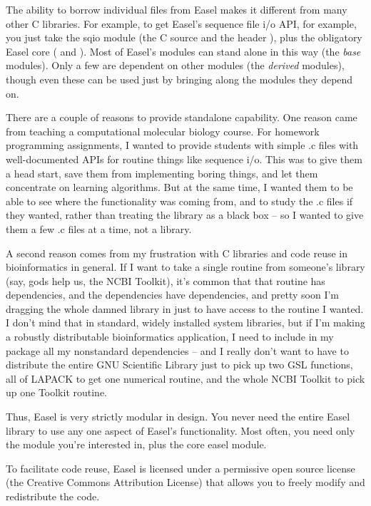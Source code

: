 The ability to borrow individual files from Easel makes it different
from many other C libraries. For example, to get Easel's sequence file
i/o API, for example, you just take the sqio module (the C source
 and the header ), plus the
obligatory Easel core ( and ). Most of
Easel's modules can stand alone in this way (the \emph{base}
modules). Only a few are dependent on other modules (the
\emph{derived} modules), though even these can be used just by
bringing along the modules they depend on.

There are a couple of reasons to provide standalone capability. One
reason came from teaching a computational molecular biology
course. For homework programming assignments, I wanted to provide
students with simple .c files with well-documented APIs for routine
things like sequence i/o. This was to give them a head start, save
them from implementing boring things, and let them concentrate on
learning algorithms. But at the same time, I wanted them to be able to
see where the functionality was coming from, and to study the .c files
if they wanted, rather than treating the library as a black box -- so
I wanted to give them a few .c files at a time, not a library.

A second reason comes from my frustration with C libraries and code
reuse in bioinformatics in general. If I want to take a single routine
from someone's library (say, gods help us, the NCBI Toolkit), it's
common that that routine has dependencies, and the dependencies have
dependencies, and pretty soon I'm dragging the whole damned library in
just to have access to the routine I wanted. I don't mind that in
standard, widely installed system libraries, but if I'm making a
robustly distributable bioinformatics application, I need to include
in my package all my nonstandard dependencies -- and I really don't
want to have to distribute the entire GNU Scientific Library just to
pick up two GSL functions, all of LAPACK to get one numerical routine,
and the whole NCBI Toolkit to pick up one Toolkit routine.

Thus, Easel is very strictly modular in design. You never need the
entire Easel library to use any one aspect of Easel's
functionality. Most often, you need only the module you're interested
in, plus the core easel module.

To facilitate code reuse, Easel is licensed under a permissive open
source license (the Creative Commons Attribution License) that allows
you to freely modify and redistribute the code.

